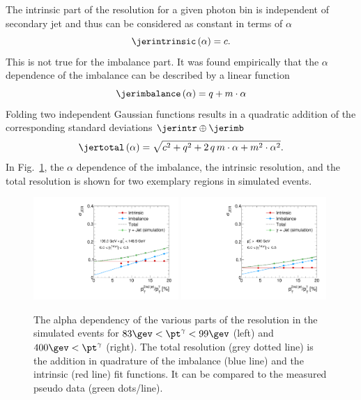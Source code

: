 The intrinsic part of the resolution for a given photon \pt bin is independent of secondary jet \pt and thus can be considered as constant in terms of $\alpha$
\begin{equation}\label{eq:intrinsic}
 \jerintrinsic \left( \alpha\right) = c.
\end{equation}
This is not true for the imbalance part. 
It was found empirically that the $\alpha$ dependence of the imbalance can be described by a linear function 
\begin{equation}\label{eq:imbalance}
  \jerimbalance \left( \alpha\right) = q + m \cdot \alpha
\end{equation}
Folding two independent Gaussian functions results in a quadratic addition of the corresponding standard deviations $\jerintr\oplus\jerimb$ 
\begin{equation}\label{eq:total}
  \jertotal \left( \alpha \right) = \sqrt{ c^2 + q^2  + 2\, q\, m \cdot \alpha +m^2 \cdot \alpha^2}. 
\end{equation}
In Fig.~\ref{fig:AlphaDependenceOfResolutions}, the $\alpha$ dependence of the imbalance, the intrinsic resolution, and the total resolution is shown for two exemplary \ptgamma regions in simulated events. 
\begin{figure}[!b]
 \centering
    \includegraphics[width=0.49\textwidth]{figures/resolution/methodology/JER_for_1_eta_bin_5_pTGamma_bin_wo_data_PFCHS_RMS99_mc.pdf} 
    \includegraphics[width=0.49\textwidth]{figures/resolution/methodology/JER_for_1_eta_bin_12_pTGamma_bin_wo_data_PFCHS_RMS99_mc.pdf} 
  \caption{The alpha dependency of the various parts of the resolution in the simulated events for $83 \gev < \pt^{\gamma} < 99 \gev $ (left) and $400 \gev < \pt^{\gamma}$ (right). 
           The total resolution (grey dotted line) is the addition in quadrature of the imbalance (blue line) and the intrinsic (red line) fit functions. 
           It can be compared to the measured pseudo data (green dots/line).}  
 \label{fig:AlphaDependenceOfResolutions}
\end{figure}

